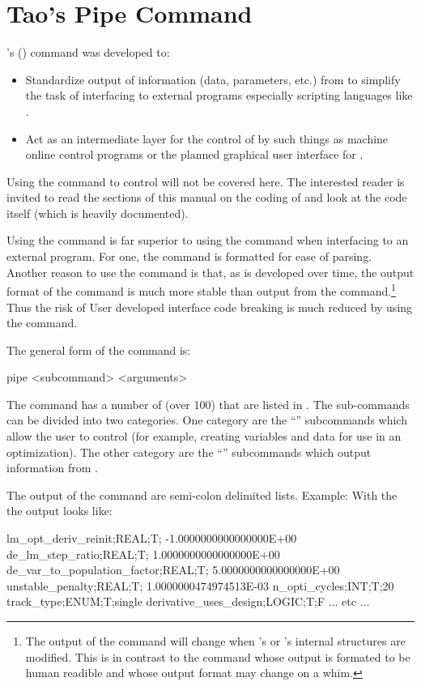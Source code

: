 \section{Tao's Pipe Command}
\label{s:pipe}

\tao's  () command was developed to:
%
\begin{itemize}
\item 
Standardize output of information (data, parameters, etc.) from \tao to simplify the task of
interfacing \tao to external programs especially scripting languages like .
% 
\item 
Act as an intermediate layer for the control of \tao by such things as machine online control
programs or the planned graphical user interface for \tao.
\end{itemize}

Using the  command to control \tao will not be covered here. The interested reader is
invited to read the sections of this manual on the coding of \tao and look at the \tao code itself
(which is heavily documented).

Using the  command is far superior to using the  command when interfacing to an
external program. For one, the  command is formatted for ease of parsing. Another reason
to use the  command is that, as \tao is developed over time, the output format of the
 command is much more stable than output from the  command.\footnote
  {
The output of the  command will change when \tao's or \bmad's internal structures are
modified. This is in contrast to the  command whose output is formated to be human readible
and whose output format may change on a whim.
  }
Thus the risk of User developed interface code breaking is much reduced by using the  command.

The general form of the  command is:
\begin{example}
  pipe <subcommand> <arguments>
\end{example}
The  command has a number of  (over 100) that are listed in
. The sub-commands can be divided into two categories. One category are the
``'' subcommands which allow the user to control \tao (for example, creating variables
and data for use in an optimization). The other category are the ``'' subcommands which
output information from \tao.

The output of the  command are semi-colon delimited lists. Example: With the
 the output looks like:
\begin{example}
  lm_opt_deriv_reinit;REAL;T; -1.0000000000000000E+00
  de_lm_step_ratio;REAL;T;  1.0000000000000000E+00
  de_var_to_population_factor;REAL;T;  5.0000000000000000E+00
  unstable_penalty;REAL;T;  1.0000000474974513E-03
  n_opti_cycles;INT;T;20
  track_type;ENUM;T;single
  derivative_uses_design;LOGIC;T;F
  ... etc ...
\end{example}

